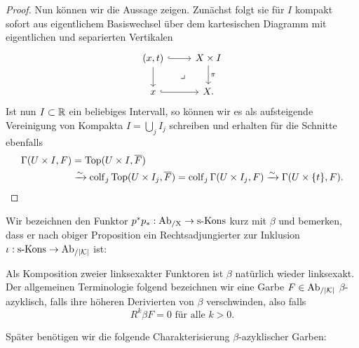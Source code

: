 \begin{proof}
  Nun können wir die Aussage zeigen. Zunächst folgt sie für $I$
  kompakt sofort aus eigentlichem Basiswechsel über dem kartesischen
  Diagramm mit eigentlichen und separierten Vertikalen
  \[ \begin{tikzcd}
    (x, t) \arrow[r, hook] \arrow[d] \arrow[dr, phantom, "\lrcorner"]
    & X \times I \arrow[d, "\pi"] \\
    x \arrow[r, hook]
    & X.
  \end{tikzcd} \]
  Ist nun $I \subset \mathbb{R}$ ein beliebiges Intervall, so können wir es
  als aufsteigende Vereinigung von Kompakta $I = \bigcup_j I_j$
  schreiben und erhalten für die Schnitte ebenfalls
  \begin{align*}
    \Gamma(U \times I, F)
     &= \operatorname{Top}(U \times I, \overline{F}) \\
     &\xrightarrow{\sim} \operatorname{colf}\limits_j \operatorname{Top}(U \times I_j, \overline{F})
     = \operatorname{colf}\limits_j \Gamma(U \times I_j, F)
     \xrightarrow{\sim} \Gamma(U \times \{t\}, F).
  \end{align*}
\end{proof}

Wir bezeichnen den Funktor $p^*p_*: \operatorname{Ab_{/X}} \to \operatorname{s-Kons}$ kurz mit $\beta$
und bemerken, dass er nach obiger Proposition ein Rechtsadjungierter
zur Inklusion $\iota: \operatorname{s-Kons} \to \operatorname{Ab}_{/|\mathcal{K}|}$ ist:


Als Komposition zweier linksexakter Funktoren ist $\beta$ natürlich
wieder linksexakt. Der allgemeinen Terminologie folgend bezeichnen wir
eine Garbe $F \in \operatorname{Ab}_{/|\mathcal{K}|}$ $\beta$-azyklisch, falls ihre höheren
Derivierten von $\beta$ verschwinden, also falls
\[ R^k\beta F = 0 \text{ für alle } k > 0.  \]

Später benötigen wir die folgende Charakterisierung
$\beta$-azyklischer Garben:

